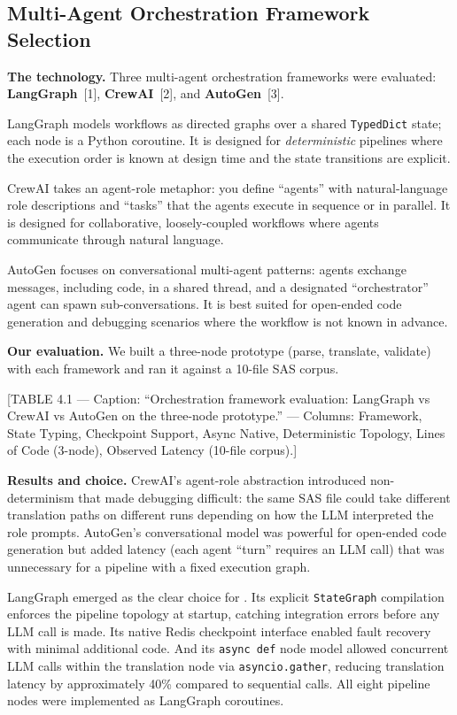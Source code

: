 \subsection{Multi-Agent Orchestration Framework Selection}
\label{subsec:framework-selection}

\textbf{The technology.} Three multi-agent orchestration frameworks were
evaluated: \textbf{LangGraph}~[1], \textbf{CrewAI}~[2], and
\textbf{AutoGen}~[3].

LangGraph models workflows as directed graphs over a shared
\texttt{TypedDict} state; each node is a Python coroutine. It is designed for
\emph{deterministic} pipelines where the execution order is known at design
time and the state transitions are explicit.

CrewAI takes an agent-role metaphor: you define ``agents'' with natural-language
role descriptions and ``tasks'' that the agents execute in sequence or in
parallel. It is designed for collaborative, loosely-coupled workflows where
agents communicate through natural language.

AutoGen focuses on conversational multi-agent patterns: agents exchange
messages, including code, in a shared thread, and a designated ``orchestrator''
agent can spawn sub-conversations. It is best suited for open-ended code
generation and debugging scenarios where the workflow is not known in advance.

\textbf{Our evaluation.} We built a three-node prototype (parse, translate,
validate) with each framework and ran it against a 10-file SAS corpus.

[TABLE 4.1 --- Caption: ``Orchestration framework evaluation: LangGraph vs
CrewAI vs AutoGen on the three-node prototype.'' --- Columns: Framework,
State Typing, Checkpoint Support, Async Native, Deterministic Topology,
Lines of Code (3-node), Observed Latency (10-file corpus).]

\textbf{Results and choice.} CrewAI's agent-role abstraction introduced
non-determinism that made debugging difficult: the same SAS file could take
different translation paths on different runs depending on how the LLM
interpreted the role prompts. AutoGen's conversational model was powerful for
open-ended code generation but added latency (each agent ``turn'' requires
an LLM call) that was unnecessary for a pipeline with a fixed execution graph.

LangGraph emerged as the clear choice for \codara{}. Its explicit
\texttt{StateGraph} compilation enforces the pipeline topology at startup,
catching integration errors before any LLM call is made. Its native Redis
checkpoint interface enabled fault recovery with minimal additional code.
And its \texttt{async def} node model allowed concurrent LLM calls within the
translation node via \texttt{asyncio.gather}, reducing translation latency
by approximately 40\% compared to sequential calls. All eight pipeline nodes
were implemented as LangGraph coroutines.


